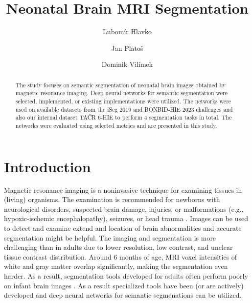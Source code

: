 \documentclass[runningheads]{llncs}
\begin{document}
%
\title{Neonatal Brain MRI Segmentation}
%
%
\author{Ľubomír Hlavko  %
\and
Jan Platoš %
\and
Dominik Vilímek %
%
}
%
%
\maketitle              %
%
\begin{abstract}
The study focuses on semantic segmentation of neonatal brain images obtained by magnetic resonance imaging. Deep neural networks for semantic segmentation were selected, implemented, or existing implementations were utilized. The networks were used on available datasets from the iSeg 2019 and BONBID-HIE 2023 challenges and also our internal dataset TAČR 6-HIE to perform 4 segmentation tasks in total. The networks were evaluated using selected metrics and are presented in this study. 

\end{abstract}

\section{Introduction}
Magnetic resonance imaging is a noninvasive technique for examining tissues in (living) organisms. The examination is recommended for newborns with neurological disorders, suspected brain damage, injuries, or malformations (e.g., hypoxic-ischemic encephalopathy), seizures, or head trauma \cite{csnn,neonatal_technical,bonbid}. Images can be used to detect and examine extend and location of brain abnormalities and accurate segmentation might be helpful. The imaging and segmentation is more challenging than in adults due to lower resolution, low contrast, and unclear tissue contrast distribution. Around 6 months of age, MRI voxel intensities of white and gray matter overlap significantly, making the segmentation even harder. As a result, segmentation tools developed for adults often perform poorly on infant brain images \cite{iseg2019}. As a result specialized tools have been (or are actively) developed and deep neural networks for semantic segmenations can be utilized.
\end{document}
